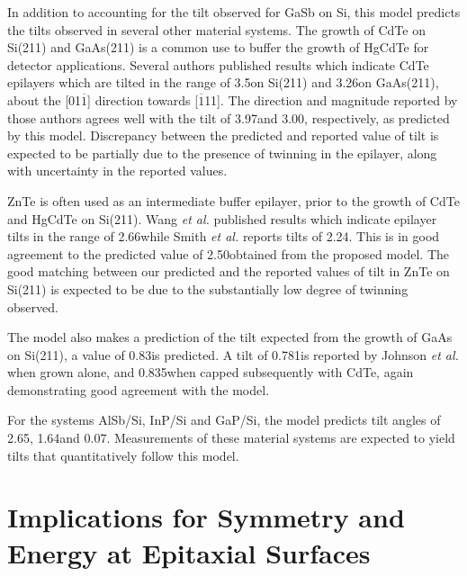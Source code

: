 In addition to accounting for the tilt observed for GaSb on Si, this model predicts the tilts observed in several other material systems. The growth of CdTe on Si(211) and GaAs(211) is a common use to buffer the growth of HgCdTe for detector applications. Several authors\cite{Triboulet2009,Yu1999,Lange1991} published results which indicate CdTe epilayers which are tilted in the range of 3.5\degree on Si(211)\cite{Zhao2011} and 3.26\degree on GaAs(211)\cite{Johnson2011}, about the [01$\overline{1}$] direction towards [$\overline{1}$11]. The direction and magnitude reported by those authors agrees well with the tilt of 3.97\degree and 3.00\degree, respectively, as predicted by this model. Discrepancy between the predicted and reported value of tilt is expected to be partially due to the presence of twinning in the epilayer, along with uncertainty in the reported values.

ZnTe is often used as an intermediate buffer epilayer, prior to the growth of CdTe and HgCdTe on Si(211).\cite{Zhao2011,Dhar1997a} Wang \textit{et al.}\cite{Wang2011a} published results which indicate epilayer tilts in the range of 2.66\degree while Smith \textit{et al.}\cite{smith2012_znte} reports tilts of 2.24\degree. This is in good agreement to the predicted value of 2.50\degree obtained from the proposed model. The good matching between our predicted and the reported values of tilt in ZnTe on Si(211) is expected to be due to the substantially low degree of twinning observed.

The model also makes a prediction of the tilt expected from the growth of GaAs on Si(211), a value of 0.83\degree is predicted. A tilt of 0.781\degree is reported by Johnson \textit{et al.}\cite{Johnson2011} when grown alone, and 0.835\degree when capped subsequently with CdTe, again demonstrating good agreement with the model.

For the systems AlSb/Si, InP/Si and GaP/Si, the model predicts tilt angles of 2.65\degree, 1.64\degree and 0.07\degree. Measurements of these material systems are expected to yield tilts that quantitatively follow this model.
\section{Implications for Symmetry and Energy at Epitaxial Surfaces}

